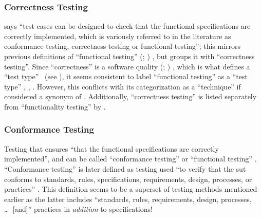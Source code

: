 \subsubsection{Correctness Testing}
\label{corr-func-test}
 \citet[p.~5-7]{SWEBOK2024} says ``test cases can be designed to
check that the functional specifications are correctly implemented, which is
variously referred to in the literature as conformance testing, correctness
testing or functional testing''; this mirrors previous definitions
of ``functional testing'' \ifnotpaper
    (\citealp[p.~21]{IEEE2022}; \citeyear[p.~196]{IEEE2017})
\else
    \cite[p.~21]{IEEE2022}, \cite[p.~196]{IEEE2017}
\fi but groups it with ``correctness
testing''. Since ``correctness'' is a software quality \ifnotpaper
    (\citealp[p.~104]{IEEE2017}; \citealp[p.~3-13]{SWEBOK2024}) \else
    \cite[p.~104]{IEEE2017}, \cite[p.~3-13]{SWEBOK2024} \fi which is
what defines a ``test type'' \citep[p.~15]{IEEE2022}\ifnotpaper\
    (see )\fi,
it seems consistent to label ``functional testing'' as a ``test type''
\ifnotpaper
    \citetext{\citealp[pp.~15,~20,~22]{IEEE2022};
        \citeyear[pp.~7,~38,~Tab.~A.1]{IEEE2021}; \citeyear[p.~4]{IEEE2016}}%
\else
    \cite[pp.~15,~20,~22]{IEEE2022}, \cite[pp.~7,~38,~Tab.~A.1]{IEEE2021},
    \cite[p.~4]{IEEE2016}\fi. However, this conflicts with its categorization
as a ``technique'' if considered a synonym of \nameref{spec-func-test}.
Additionally, ``correctness testing'' is listed separately from ``functionality
testing'' by \citet[p.~53]{Firesmith2015}.

\subsubsection{Conformance Testing}
Testing that ensures ``that the functional specifications are correctly
implemented'', and can be called ``conformance testing'' or ``functional
testing'' \citep[p.~5-7]{SWEBOK2024}.
``Conformance testing'' is later defined as testing used ``to
verify that the \acs{sut} conforms to standards, rules,
specifications, requirements, design, processes, or practices''
\citep[p.~5-7]{SWEBOK2024}. This definition seems to be a superset
of testing methods mentioned earlier as the latter includes ``standards,
rules, requirements, design, processes, \dots\ [and]'' practices in
\emph{addition} to specifications!

